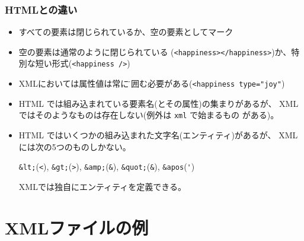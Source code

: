  \begin{frame}[containsverbatim]
  \frametitle{HTMLとの違い}
\begin{itemize}
 \item すべての要素は閉じられているか、空の要素としてマーク
 \item 空の要素は通常のように閉じられている
			 (\texttt{<happiness></happiness>})か、特別な短い形式(\texttt{<happiness />})
 \item XMLにおいては属性値は常に\"で囲む必要がある(\Verb+<happiness type="joy"+)
 \item HTML では組み込まれている要素名(とその属性)の集まりがあるが、 XML
			 ではそのようなものは存在しない(例外は \texttt{xml} で始まるもの
			 がある)。
 \item  HTML ではいくつかの組み込まれた文字名(エンティティ)があるが、
				XML には次の5つのものしかない。

				\Verb+&lt;+(\Verb+<+), \Verb+&gt;+(\Verb+>+), \Verb+&amp;+(\Verb+&+),
				\Verb+&quot;+(\Verb+&+), \Verb+&apos+(\Verb+'+)

				XMLでは独自にエンティティを定義できる。
\end{itemize}
\end{frame}
\section{XMLファイルの例}
